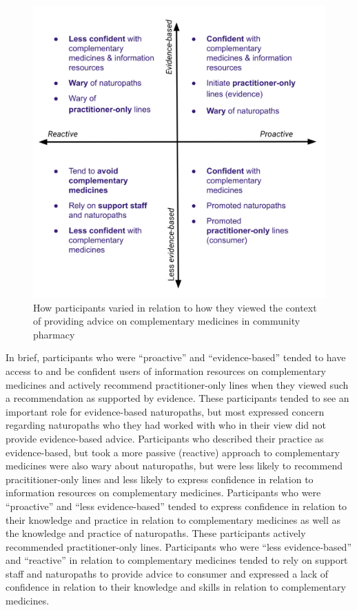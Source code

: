 \documentclass[12pt,]{article}
\begin{document}
\begin{figure}
\centering
\includegraphics{files/CMEthics_context2.png}
\caption{How participants varied in relation to how they viewed the
context of providing advice on complementary medicines in community
pharmacy \label{fig_context2}}
\end{figure}

In brief, participants who were ``proactive'' and ``evidence-based''
tended to have access to and be confident users of information resources
on complementary medicines and actively recommend practitioner-only
lines when they viewed such a recommendation as supported by evidence.
These participants tended to see an important role for evidence-based
naturopaths, but most expressed concern regarding naturopaths who they
had worked with who in their view did not provide evidence-based advice.
Participants who described their practice as evidence-based, but took a
more passive (reactive) approach to complementary medicines were also
wary about naturopaths, but were less likely to recommend
pracititioner-only lines and less likely to express confidence in
relation to information resources on complementary medicines.
Participants who were ``proactive'' and ``less evidence-based'' tended
to express confidence in relation to their knowledge and practice in
relation to complementary medicines as well as the knowledge and
practice of naturopaths. These participants actively recommended
practitioner-only lines. Participants who were ``less evidence-based''
and ``reactive'' in relation to complementary medicines tended to rely
on support staff and naturopaths to provide advice to consumer and
expressed a lack of confidence in relation to their knowledge and skills
in relation to complementary medicines.
\end{document}
